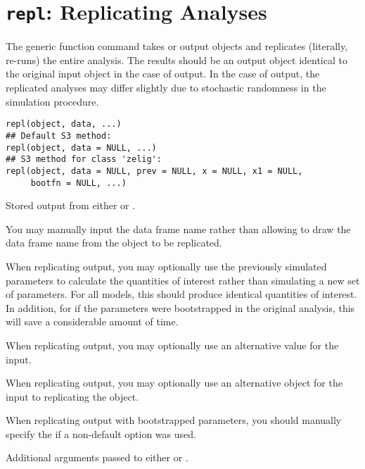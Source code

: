  \section{{\tt repl}: Replicating Analyses}\label{ss:repl}
\begin{Description}\relax
The generic function  command takes 
 or
 output objects and replicates (literally, re-runs)
the entire analysis.  The results should be an output 
object
identical to the original input object in the case of
 output.  In the case of 
output, the replicated analyses may differ slightly due to
stochastic randomness in the simulation procedure.
\end{Description}
\begin{Usage}
\begin{verbatim}
repl(object, data, ...)
## Default S3 method:
repl(object, data = NULL, ...)
## S3 method for class 'zelig':
repl(object, data = NULL, prev = NULL, x = NULL, x1 = NULL,
     bootfn = NULL, ...) 
\end{verbatim}
\end{Usage}
\begin{Arguments}
\begin{ldescription}
\item[\code{object}] Stored output from either  or
.
\item[\code{data}] You may manually input the data frame name rather
than allowing  to draw the data frame name from the object
to be replicated.
\item[\code{prev}] When replicating  output, you may
optionally use the previously simulated parameters to calculate the
quantities of interest rather than simulating a new set of
parameters.  For all models, this should produce identical
quantities of interest.  In addition, for if the parameters were
bootstrapped in the original analysis, this will save a considerable
amount of time. 
\item[\code{x}] When replicating  output, you may
optionally use an alternative  value for the 
input. 
\item[\code{x1}] When replicating  output, you may
optionally use an alternative  object for the 
input to replicating the  object. 
\item[\code{bootfn}] When replicating  output with
bootstrapped parameters, you should manually specify the
 if a non-default option was used.  
\item[\code{...}] Additional arguments passed to either  or 
.  
\end{ldescription}
\end{Arguments}
